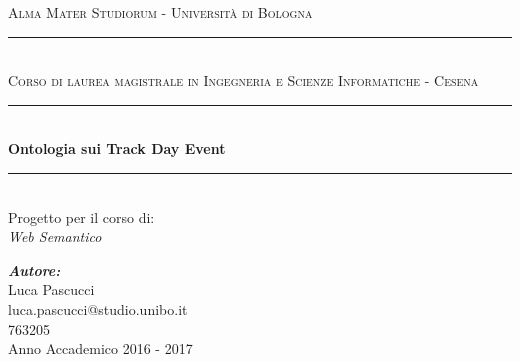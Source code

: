 
\begin{titlepage}

\newcommand{\HRule}{\rule{\linewidth}{0.5mm}} 
 \newcommand{\LRule}{\rule{\linewidth}{0.2mm}}

\center %



  \textsc{\Large Alma Mater Studiorum - Università di Bologna} \\ %
  \LRule\\
  \textsc{\Large Corso di laurea magistrale in Ingegneria e Scienze Informatiche - Cesena}\\[0.5cm] %
  

 \vspace{1.5 cm}
  \HRule \\[0.4cm]
  { \huge \bfseries Ontologia sui Track Day Event}\\[0.4cm] %
  \HRule\\[1.0cm]
  Progetto per il corso di:\\
  \textit{Web Semantico}
  \vspace{4.5 cm}
  
  
  {\em\Large\textbf {Autore:}} \\
  \vspace{.5 cm}
  Luca Pascucci \\
  luca.pascucci@studio.unibo.it \\
  763205 \\
  

  \vspace{4 cm}
  {\large Anno Accademico 2016 - 2017} %


\vfill %

\end{titlepage}

